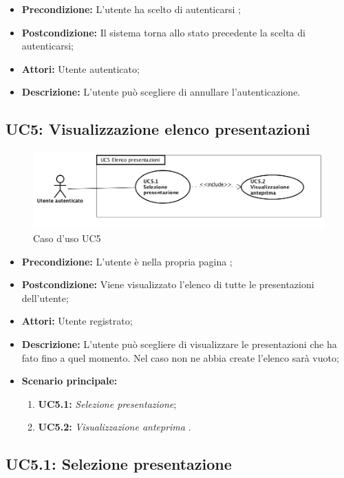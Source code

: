\begin{itemize}
	\item \textbf{Precondizione:} L'utente ha scelto di autenticarsi ;
	\item \textbf{Postcondizione:} Il sistema torna allo stato precedente la scelta di autenticarsi;
	\item \textbf{Attori:} Utente autenticato;
	\item \textbf{Descrizione:} L'utente può scegliere di annullare l'autenticazione.
\end{itemize}
\subsection{ UC5: Visualizzazione elenco presentazioni}

\begin{figure}[h]
	\begin{center}
	\includegraphics[scale=0.5]{diagram/UC5.png}
	\caption{Caso d'uso UC5}
	\end{center}
\end{figure}
\begin{itemize}
	\item \textbf{Precondizione:} L'utente è nella propria pagina ;
	\item \textbf{Postcondizione:} Viene visualizzato l'elenco di tutte le presentazioni dell'utente;
	\item \textbf{Attori:} Utente registrato;
	\item \textbf{Descrizione:} L'utente può scegliere di visualizzare le presentazioni che ha fato fino a quel momento. Nel caso non ne abbia create l'elenco sarà vuoto;
	\item \textbf{Scenario principale:}
	\begin{enumerate}
		\item \textbf{ UC5.1:} \textit{ Selezione presentazione};
		\item \textbf{ UC5.2:} \textit{ Visualizzazione anteprima }.
	\end{enumerate}
\end{itemize}

\newpage
\subsection{ UC5.1: Selezione presentazione}


